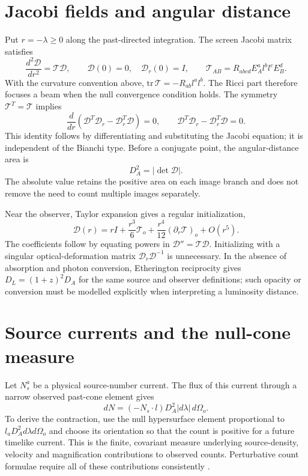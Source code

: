 \section{Jacobi fields and angular distance}
Put $r=-\lambda\ge0$ along the past-directed integration. The screen Jacobi matrix satisfies
\begin{equation}\label{vii:jacobi}
\frac{d^2\mathcal D}{dr^2}=\mathcal T\mathcal D,\qquad
\mathcal D(0)=0,\quad \mathcal D_r(0)=I,\qquad
\mathcal T_{AB}=R_{abcd}E_A^al^bl^cE_B^d.
\end{equation}
With the curvature convention above, $\mathrm{tr}\,\mathcal T=-R_{ab}l^al^b$. The Ricci part therefore focuses a beam when the null convergence condition holds. The symmetry $\mathcal T^T=\mathcal T$ implies
\begin{equation}\label{vii:wronskian}
\frac{d}{dr}(\mathcal D^T\mathcal D_r-\mathcal D_r^T\mathcal D)=0,
\qquad \mathcal D^T\mathcal D_r-\mathcal D_r^T\mathcal D=0.
\end{equation}
This identity follows by differentiating and substituting the Jacobi equation; it is independent of the Bianchi type. Before a conjugate point, the angular-distance area is
\begin{equation}\label{vii:angular_distance}
D_A^2=|\det\mathcal D|.
\end{equation}
The absolute value retains the positive area on each image branch and does not remove the need to count multiple images separately.

Near the observer, Taylor expansion gives a regular initialization,
\begin{equation}\label{vii:vertex_series}
\mathcal D(r)=rI+\frac{r^3}{6}\mathcal T_o+
\frac{r^4}{12}(\partial_r\mathcal T)_o+O(r^5).
\end{equation}
The coefficients follow by equating powers in $\mathcal D''=\mathcal T\mathcal D$. Initializing with a singular optical-deformation matrix $\mathcal D_r\mathcal D^{-1}$ is unnecessary. In the absence of absorption and photon conversion, Etherington reciprocity gives $D_L=(1+z)^2D_A$ for the same source and observer definitions; such opacity or conversion must be modelled explicitly when interpreting a luminosity distance.

\section{Source currents and the null-cone measure}
Let $N_s^a$ be a physical source-number current. The flux of this current through a narrow observed past-cone element gives
\begin{equation}\label{vii:cone_count}
dN=(-N_s\cdot l)D_A^2|d\lambda|\,d\Omega_o.
\end{equation}
To derive the contraction, use the null hypersurface element proportional to $l_aD_A^2d\lambda d\Omega_o$ and choose its orientation so that the count is positive for a future timelike current. This is the finite, covariant measure underlying source-density, velocity and magnification contributions to observed counts. Perturbative count formulae require all of these contributions consistently \cite{ChallinorLewis2011}.

